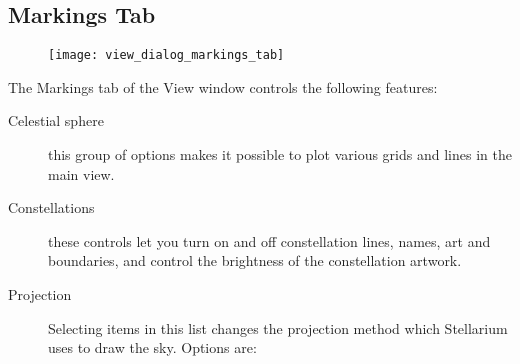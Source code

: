 \subsection{Markings Tab}\label{marking-tab}

\begin{figure}[h]
\centering\texttt{[image: view\_dialog\_markings\_tab]}
\end{figure}

The Markings tab of the View window controls the following features:

\begin{description}
\item[Celestial sphere] this group of options makes it possible to
  plot various grids and lines in the main view.
\item[Constellations] these controls let you turn on and off
  constellation lines, names, art and boundaries, and control the
  brightness of the constellation artwork.
\item[Projection] Selecting items in this list changes the
  projection method which Stellarium uses to draw the sky. Options are:


\end{description}
